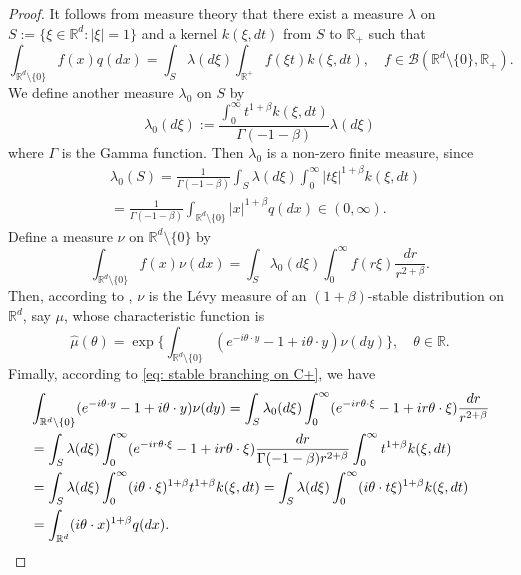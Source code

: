 \documentclass[12pt,a4paper]{amsart}
\theoremstyle{plain}
\theoremstyle{definition}
\numberwithin{equation}{section}
\begin{document}
\begin{proof}
    It follows from measure theory that there exist a measure $\lambda$ on $S:= \{\xi\in \mathbb R^d:|\xi| = 1\}$ and a kernel $k(\xi,dt)$ from $S$ to $\mathbb R_+$ such that
\[
    \int_{\mathbb R^d\setminus \{0\}} f(x)q(dx) = \int_S \lambda(d\xi) \int_{\mathbb R^+} f(\xi t)k(\xi,dt),\quad
    f\in \mathcal B(\mathbb R^d\setminus \{0\}, \mathbb R_+).
\]
    We define another measure $\lambda_0$ on $S$ by
\[
    \lambda_0(d\xi) := \frac{\int_0^\infty t^{1+\beta}k(\xi,dt)}{\Gamma(-1-\beta)} \lambda (d\xi)
\]
    where $\Gamma$ is the Gamma function.
    Then $\lambda_0$ is a non-zero finite measure, since
\begin{align}
    &\lambda_0(S) = \frac{1}{\Gamma(-1-\beta)} \int_S \lambda (d\xi) \int_0^\infty |t\xi|^{1+\beta}k(\xi,dt)
    \\&= \frac{1}{\Gamma(-1-\beta)} \int_{\mathbb R^d\setminus\{0\}} |x|^{1+\beta} q(dx) \in (0,\infty).
\end{align}
    Define a measure $\nu$ on $\mathbb R^d\setminus\{0\}$ by
\[
    \int_{\mathbb R^d\setminus\{0\}}f(x)\nu(dx)= \int_{S} \lambda_0(d\xi) \int_0^\infty f(r\xi) \frac{dr}{r^{2+\beta}} .
\]
    Then, according to \cite[Remark 14.4]{Sato2013Levy}, $\nu$ is the L\'evy measure of an $(1+\beta)$-stable distribution on $\mathbb R^d$, say $\mu$, whose characteristic function is
\[
    \hat \mu(\theta)
    =\exp\Big\{\int_{\mathbb R^d\setminus\{0\}} (e^{-i\theta \cdot y}-1+i\theta \cdot y) \nu(dy)\Big\},
    \quad \theta \in \mathbb R.
\]
    Fimally, according to \eqref{eq: stable branching on C+}, we have
\begin{equation}\begin{split}
    &\int_{\mathbb R^d\setminus\{0\}} (e^{-i\theta \cdot y}-1+i\theta \cdot y) \nu(dy)
    = \int_S \lambda_0(d\xi) \int_0^\infty (e^{-ir\theta \cdot \xi}-1+ir\theta \cdot \xi) \frac{dr}{r^{2+\beta}}
    \\& = \int_S \lambda (d\xi) \int_0^\infty (e^{-ir\theta \cdot \xi}-1+ir\theta \cdot \xi) \frac{dr}{\Gamma(-1-\beta)r^{2+\beta}}\int_0^\infty t^{1+\beta} k(\xi,dt)
    \\& = \int_S \lambda (d\xi) \int_0^\infty (i\theta\cdot \xi)^{1+\beta} t^{1+\beta} k(\xi,dt)
    = \int_S \lambda(d\xi) \int_0^\infty (i\theta \cdot t\xi)^{1+\beta} k(\xi,dt)
    \\& = \int_{\mathbb R^d} (i\theta \cdot x)^{1+\beta} q(dx).
    \qedhere
\end{split}\end{equation}
\end{proof}
\end{document}
